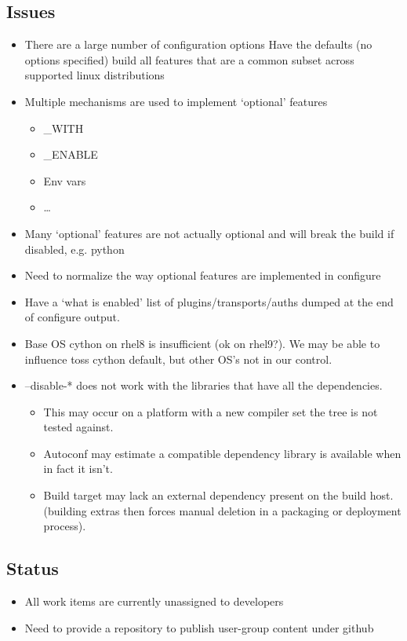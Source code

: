 \documentclass{article}
\begin{document}
\subsection{Issues}
    \begin{itemize}
        \item There are a large number of configuration options Have the defaults (no options specified) build all features that are a common subset across supported linux distributions
        \item Multiple mechanisms are used to implement ‘optional’ features
            \begin{itemize}
                \item \_WITH
                \item \_ENABLE
                \item Env vars
                \item …
            \end{itemize}
        \item Many ‘optional’ features are not actually optional and will break the build if disabled, e.g. python
        \item Need to normalize the way optional features are implemented in configure
        \item Have a ‘what is enabled’ list of plugins/transports/auths dumped at the end of configure output. 
        \item Base OS cython on rhel8 is insufficient (ok on rhel9?). We may be able to influence toss cython default, but other OS’s not in our control.
        \item –disable-* does not work with the libraries that have all the dependencies.
            \begin{itemize}
                \item This may occur on a platform with a new compiler set the tree is not tested against.
                \item Autoconf may estimate a compatible dependency library is available when in fact it isn’t.
                \item Build target may lack an external dependency present on the build host. (building extras then forces manual deletion in a packaging or deployment process).
            \end{itemize}
    \end{itemize}

\subsection{Status}
    \begin{itemize}
        \item All work items are currently unassigned to developers
        \item Need to provide a repository to publish user-group content under github
    \end{itemize}
    
\end{document}
